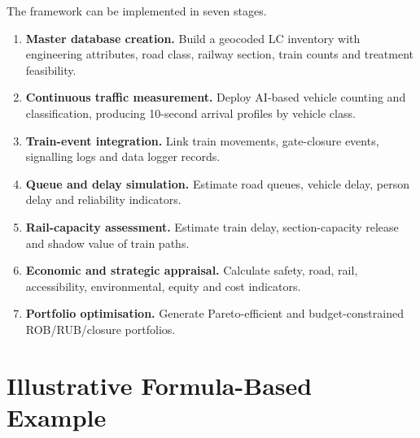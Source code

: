 \documentclass[11pt,a4paper]{article}
\begin{document}
The framework can be implemented in seven stages.

\begin{enumerate}[label=\textbf{Stage \arabic*:},leftmargin=*]
\item \textbf{Master database creation.} Build a geocoded LC inventory with engineering attributes, road class, railway section, train counts and treatment feasibility.
\item \textbf{Continuous traffic measurement.} Deploy AI-based vehicle counting and classification, producing 10-second arrival profiles by vehicle class.
\item \textbf{Train-event integration.} Link train movements, gate-closure events, signalling logs and data logger records.
\item \textbf{Queue and delay simulation.} Estimate road queues, vehicle delay, person delay and reliability indicators.
\item \textbf{Rail-capacity assessment.} Estimate train delay, section-capacity release and shadow value of train paths.
\item \textbf{Economic and strategic appraisal.} Calculate safety, road, rail, accessibility, environmental, equity and cost indicators.
\item \textbf{Portfolio optimisation.} Generate Pareto-efficient and budget-constrained ROB/RUB/closure portfolios.
\end{enumerate}

\section{Illustrative Formula-Based Example}
\end{document}
